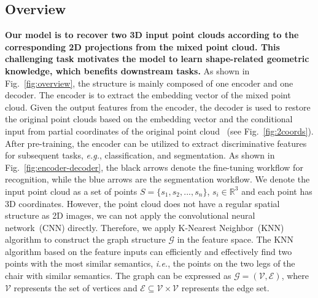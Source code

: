 \documentclass[journal]{IEEEtran}
\def\eg{\emph{e.g.}}
\def\ie{\emph{i.e.}}
\begin{document}
\subsection{Overview}
\textbf{Our model is to recover two 3D input point clouds according to the corresponding 2D projections from the mixed point cloud. This challenging task motivates the model to learn shape-related geometric knowledge, which benefits downstream tasks.}
As shown in Fig.~\ref{fig:overview}, the structure is mainly composed of one encoder and one decoder. The encoder is to extract the embedding vector of the mixed point cloud. Given the output features from the encoder, the decoder is used to restore the original point clouds based on the embedding vector and the conditional input from partial coordinates of the original point cloud ~(see Fig.~\ref{fig:2coords}).
After pre-training, the encoder can be utilized to extract discriminative features for subsequent tasks, \eg, classification, and segmentation. As shown in Fig.~\ref{fig:encoder-decoder}, the black arrows denote the fine-tuning workflow for recognition, while the blue arrows are the segmentation workflow. 
We denote the input point cloud as a set of points $S=\{s_1, s_2, ... ,s_n\}$, $s_i \in \mathbb{R}^3$ and each point has 3D coordinates. However, the point cloud does not have a regular spatial structure as 2D images, we can not apply the convolutional neural network~(CNN) directly. 
Therefore, we apply K-Nearest Neighbor~(KNN) algorithm to construct the graph structure $\mathcal{G}$ in the feature space. The KNN algorithm based on the feature inputs can efficiently and effectively find two points with the most similar semantics, \ie, the points on the two legs of the chair with similar semantics. The graph can be expressed as $\mathcal{G}=(\mathcal{V},\mathcal{E})$, where $\mathcal{V}$ represents the set of vertices and $\mathcal{E}\subseteq \mathcal{V} \times \mathcal{V}$ represents the edge set. 
\end{document}
